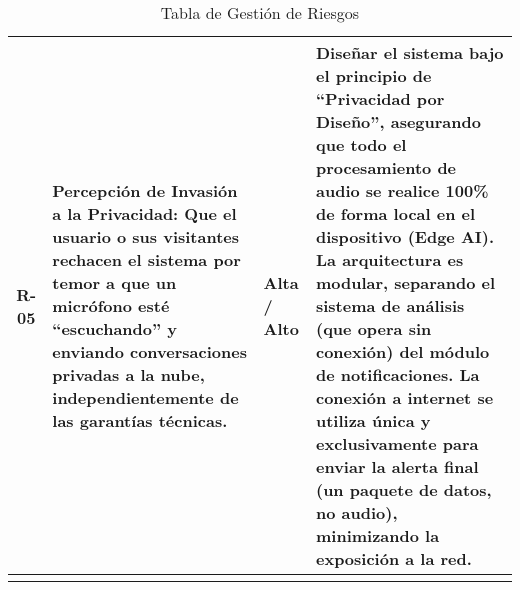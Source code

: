 {\begin{longtable}[c]{c p{5.8cm} >{\centering\arraybackslash}p{2cm} p{5.8cm}}
      \addlinespace
      R-05 & Percepción de Invasión a la Privacidad: Que el usuario o sus visitantes rechacen el sistema por temor a que un micrófono esté ``escuchando'' y enviando conversaciones privadas a la nube, independientemente de las garantías técnicas.                          & Alta / Alto            & Diseñar el sistema bajo el principio de ``Privacidad por Diseño'', asegurando que todo el procesamiento de audio se realice 100\% de forma local en el dispositivo (Edge AI). La arquitectura es modular, separando el sistema de análisis (que opera sin conexión) del módulo de notificaciones. La conexión a internet se utiliza única y exclusivamente para enviar la alerta final (un paquete de datos, no audio), minimizando la exposición a la red. \\
      \bottomrule
      \addlinespace

      \caption{Tabla de Gestión de Riesgos}
      \label{tab:risk-management}
    \end{longtable}
  }